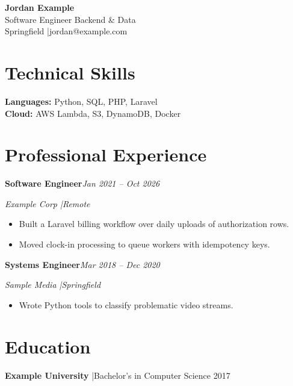 \documentclass[10pt,letterpaper]{article}
\newcommand{\job}[3]{%
  \vspace{0.42em}\textbf{#1}\hfill\textit{#3}\par
  \textit{#2}\par
}
\begin{document}
\begin{center}
  {\LARGE\bfseries Jordan Example}\\[0.12em]
  {\large Software Engineer \textbar{} Backend \& Data}\\[0.18em]
  Springfield \quad|\quad jordan@example.com
\end{center}

\section*{Technical Skills}
\textbf{Languages:} Python, SQL, PHP, Laravel\\
\textbf{Cloud:} AWS Lambda, S3, DynamoDB, Docker

\section*{Professional Experience}

\job{Software Engineer}{Example Corp \quad|\quad Remote}
{Jan 2021 -- Oct 2026}
\begin{itemize}
  \item Built a Laravel billing workflow over daily uploads of authorization rows.
  \item Moved clock-in processing to queue workers with idempotency keys.
\end{itemize}

\job{Systems Engineer}{Sample Media \quad|\quad Springfield}
{Mar 2018 -- Dec 2020}
\begin{itemize}
  \item Wrote Python tools to classify problematic video streams.
\end{itemize}

\section*{Education}
\textbf{Example University} \quad|\quad Bachelor's in Computer Science \hfill 2017
\end{document}
